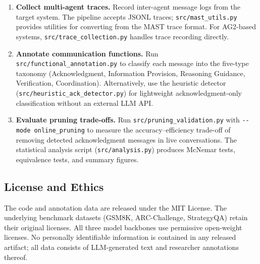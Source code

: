 \begin{enumerate}[nosep]
  \item \textbf{Collect multi-agent traces.} Record inter-agent message logs from the target system. The pipeline accepts JSONL traces; \texttt{src/mast\_utils.py} provides utilities for converting from the MAST trace format. For AG2-based systems, \texttt{src/trace\_collection.py} handles trace recording directly.
  \item \textbf{Annotate communication functions.} Run \texttt{src/functional\_annotation.py} to classify each message into the five-type taxonomy (Acknowledgment, Information Provision, Reasoning Guidance, Verification, Coordination). Alternatively, use the heuristic detector (\texttt{src/heuristic\_ack\_detector.py}) for lightweight acknowledgment-only classification without an external LLM API.
  \item \textbf{Evaluate pruning trade-offs.} Run \texttt{src/pruning\_validation.py} with \texttt{-{}-mode online\_pruning} to measure the accuracy--efficiency trade-off of removing detected acknowledgment messages in live conversations. The statistical analysis script (\texttt{src/analysis.py}) produces McNemar tests, equivalence tests, and summary figures.
\end{enumerate}

\subsection{License and Ethics}

The code and annotation data are released under the MIT License. The underlying benchmark datasets (GSM8K, ARC-Challenge, StrategyQA) retain their original licenses. All three model backbones use permissive open-weight licenses. No personally identifiable information is contained in any released artifact; all data consists of LLM-generated text and researcher annotations thereof.
